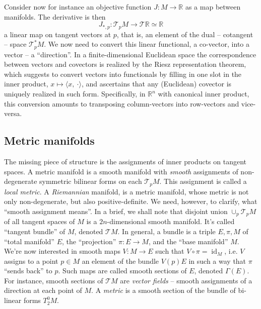 Consider now for instance an objective function \( J: M \to \mathbb{R} \) as a
map between manifolds. The derivative is then \[ J_{*,p} : \mathcal{T}_pM \to
\mathcal{T}\mathbb{R}\simeq\mathbb{R} \] a linear map on tangent vectors at \(
p \), that is, an element of the dual -- cotangent -- space \( \mathcal{T}_p^*M
\). We now need to convert this linear functional, a co-vector, into a vector
-- a ``direction''. In a finite-dimensional Euclidean space the correspondence
between vectors and covectors is realized by the Riesz representation theorem,
which suggests to convert vectors into functionals by filling in one slot
in the inner product, \( x\mapsto \langle x,~\cdot\rangle \), and ascertains
that any (Euclidean) covector is uniquely realized in such form. Specifically,
in \( \mathbb{R}^n \) with canonical inner product, this conversion amounts
to transposing column-vectors into row-vectors and vice-versa.

\subsection*{Metric manifolds} \label{sec:metricMfds}

The missing piece of structure is the assignments of inner products on tangent
spaces. A metric manifold is a smooth manifold with \emph{smooth} assignments
of non-degenerate symmetric bilinear forms on each \( \mathcal{T}_pM \).  This
assignment is called a \emph{local metric}.  A \emph{Riemannian} manifold, is a
metric manifold, whose metric is not only non-degenerate, but also
positive-definite.
We need, however, to clarify, what ``smooth assignment means''.  In a brief, we
shall note that disjoint union \( \cup_p\mathcal{T}_pM \) of all tangent spaces
of \( M \) is a \( 2n \)-dimensional smooth manifold. It's called ``tangent
bundle'' of \( M \), denoted \( \mathcal{T}M \). In general, a bundle is a
triple \( E, \pi, M \) of ``total manifold'' \( E \), the ``projection'' \(
\pi: E\to M \), and the ``base manifold'' \( M \). We're now interested in
smooth maps \( V: M \to E \) such that \( V\circ\pi = \operatorname{id}_M \),
i.e. \( V \) assigns to a point \( p\in M \) an element of the bundle \( V(p) E
\) in such a way that \( \pi \) ``sends back'' to \( p \). Such maps are called
smooth sections of \( E \), denoted \( \Gamma(E) \). For instance,
smooth sections of \( \mathcal{T}M \) are \emph{vector fields} -- smooth assignments
of a direction at each point of \( M \). A \emph{metric} is a smooth section
of the bundle of bi-linear forms \( T^0_2M \).

